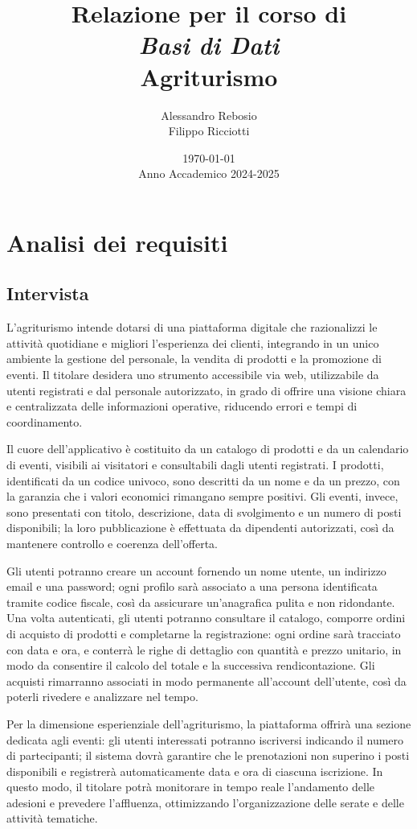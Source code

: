 \documentclass[a4paper,12pt]{report}
\title{
  \vspace*{2cm}
  \LARGE Relazione per il corso di \\[0.5cm]
  \textit{Basi di Dati} \\[2cm]
  \Huge\textbf{Agriturismo} \\[2cm]
}
\author{
  \Large
  Alessandro Rebosio \\
  Filippo Ricciotti
}
\date{
  \vspace{1cm}
  \today \\[0.5cm]
  Anno Accademico 2024-2025
}
\begin{document}
\maketitle

\tableofcontents

\chapter{Analisi dei requisiti}
\section{Intervista}

L'agriturismo intende dotarsi di una piattaforma digitale che
razionalizzi le attività quotidiane
e migliori l'esperienza dei clienti, integrando in un unico ambiente
la gestione del personale,
la vendita di prodotti e la promozione di eventi. Il titolare
desidera uno strumento accessibile
via web, utilizzabile da utenti registrati e dal personale
autorizzato, in grado di offrire una
visione chiara e centralizzata delle informazioni operative,
riducendo errori e tempi di
coordinamento.

Il cuore dell'applicativo è costituito da un catalogo di prodotti e
da un calendario di
eventi, visibili ai visitatori e consultabili dagli utenti
registrati. I prodotti, identificati
da un codice univoco, sono descritti da un nome e da un prezzo, con
la garanzia che i valori
economici rimangano sempre positivi. Gli eventi, invece, sono
presentati con titolo,
descrizione, data di svolgimento e un numero di posti disponibili; la
loro pubblicazione è
effettuata da dipendenti autorizzati, così da mantenere controllo e
coerenza dell'offerta.

Gli utenti potranno creare un account fornendo un nome utente, un
indirizzo email e una
password; ogni profilo sarà associato a una persona identificata
tramite codice fiscale,
così da assicurare un'anagrafica pulita e non ridondante. Una volta
autenticati, gli utenti
potranno consultare il catalogo, comporre ordini di acquisto di
prodotti e completarne la
registrazione: ogni ordine sarà tracciato con data e ora, e conterrà
le righe di dettaglio con
quantità e prezzo unitario, in modo da consentire il calcolo del
totale e la successiva
rendicontazione. Gli acquisti rimarranno associati in modo permanente
all'account dell'utente,
così da poterli rivedere e analizzare nel tempo.

Per la dimensione esperienziale dell'agriturismo, la piattaforma
offrirà una sezione dedicata
agli eventi: gli utenti interessati potranno iscriversi indicando il
numero di partecipanti; il
sistema dovrà garantire che le prenotazioni non superino i posti
disponibili e registrerà
automaticamente data e ora di ciascuna iscrizione. In questo modo, il
titolare potrà monitorare
in tempo reale l'andamento delle adesioni e prevedere l'affluenza,
ottimizzando l'organizzazione
delle serate e delle attività tematiche.
\end{document}
